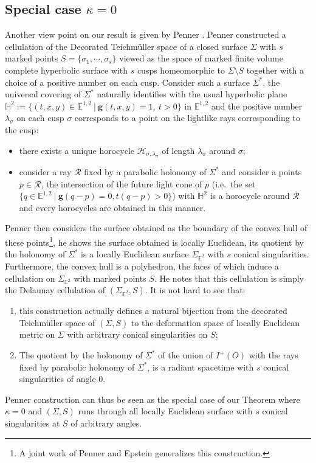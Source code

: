 \documentclass[a4paper,12pt]{article}
\def\H{\mathbb{H}}
\def\R{\mathbb{R}}
\def\E{\mathbf E}
\def\E{\mathbb{E}}
\newcommand{\mass}[1]{{\mathbb E}^{1,2}_{#1}}
\def\R{\mathcal R}
\def\quadform{\mathbf{g}}
\def\E{\mathbb{E}}
\theoremstyle{definition}
\begin{document}
	\subsection{Special case $\kappa=0$}
		Another view point on our result is given by Penner \cite{penner1987,MR3052157}. Penner constructed a cellulation of the Decorated Teichmüller space of a closed surface $\Sigma$ with $s$ marked points $S=\{\sigma_1,\cdots,\sigma_s\}$ viewed as the space of marked finite volume complete hyperbolic surface with $s$ cusps homeomorphic to $\Sigma\setminus S$ together with a choice of a positive number on each cusp.
		Consider such a surface $\Sigma^*$, the universal covering of $\Sigma^*$ naturally identifies with the usual hyperbolic plane $\H^2:=\{(t,x,y)\in \mass{}~|~\quadform(t,x,y)=1,~t>0\}$ in $\mass{}$ and the positive number $\lambda_\sigma$ on each cusp $\sigma$ corresponds to a point on the lightlike rays corresponding to the cusp:
		\begin{itemize}
		 \item there exists a unique horocycle $\mathcal{H}_{\sigma,\lambda_\sigma}$ of length $\lambda_\sigma$ around $\sigma$;
		 \item consider a ray $\R$ fixed by a parabolic holonomy of $\Sigma^*$ and consider a points $p\in \R$, the intersection of the future light cone of $p$ (i.e.\ the set $\{q\in \mass{}~|~ \quadform(q-p)=0, t(q-p)>0\}$) with $\H^2$ is a horocycle around $\R$ and every horocycles are obtained in this manner.
		\end{itemize}
		
		Penner  then considers the surface obtained as the boundary of the convex hull of these points\footnote{A joint work of Penner and Epstein \cite{MR918457} generalizes this construction.}, he shows the surface obtained is locally Euclidean, its quotient by the holonomy of $\Sigma^*$ is a locally Euclidean surface $\Sigma_{\E^2}$ with $s$ conical singularities. Furthermore, the convex hull is a polyhedron, the faces of which induce a cellulation on $\Sigma_{\E^2}$ with marked points $S$. He notes that this cellulation is simply the Delaunay cellulation of $(\Sigma_{\E^2}, S)$. 
		It is not hard to see that:
		\begin{enumerate}
		 \item this construction actually defines a natural bijection from the decorated Teichmüller space of $(\Sigma, S)$ to the deformation space of locally Euclidean metric on $\Sigma$ with arbitrary conical singularities on $S$;
		 \item The quotient by the holonomy of $\Sigma^*$ of the union of $I^+(O)$ with the rays fixed by parabolic holonomy of $\Sigma^*$, is a radiant spacetime with $s$ conical singularities of angle $0$.
		\end{enumerate}
		Penner construction can thus be seen as the special case of our Theorem where $\kappa=0$ and $(\Sigma, S)$ runs through all locally Euclidean surface with $s$ conical singularities at $S$ of arbitrary angles. 
		
\end{document}
